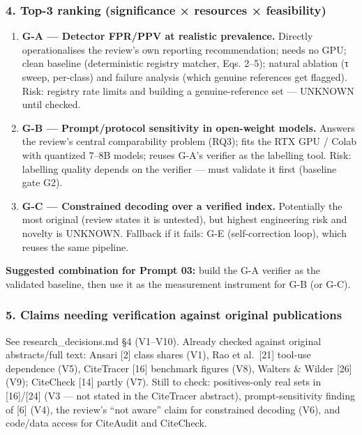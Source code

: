 \documentclass[
  10pt,
]{article}
\providecommand{\tightlist}{%
  \setlength{\itemsep}{0pt}\setlength{\parskip}{0pt}}
\begin{document}
\hypertarget{top-3-ranking-significance-resources-feasibility}{%
\subsubsection{4. Top-3 ranking (significance × resources ×
feasibility)}\label{top-3-ranking-significance-resources-feasibility}}

\begin{enumerate}
\def\labelenumi{\arabic{enumi}.}
\tightlist
\item
  \textbf{G-A --- Detector FPR/PPV at realistic prevalence.} Directly
  operationalises the review's own reporting recommendation; needs no
  GPU; clean baseline (deterministic registry matcher, Eqs. 2--5);
  natural ablation (τ sweep, per-class) and failure analysis (which
  genuine references get flagged). Risk: registry rate limits and
  building a genuine-reference set --- UNKNOWN until checked.
\item
  \textbf{G-B --- Prompt/protocol sensitivity in open-weight models.}
  Answers the review's central comparability problem (RQ3); fits the RTX
  GPU / Colab with quantized 7--8B models; reuses G-A's verifier as the
  labelling tool. Risk: labelling quality depends on the verifier ---
  must validate it first (baseline gate G2).
\item
  \textbf{G-C --- Constrained decoding over a verified index.}
  Potentially the most original (review states it is untested), but
  highest engineering risk and novelty is UNKNOWN. Fallback if it fails:
  G-E (self-correction loop), which reuses the same pipeline.
\end{enumerate}

\textbf{Suggested combination for Prompt 03:} build the G-A verifier as
the validated baseline, then use it as the measurement instrument for
G-B (or G-C).

\hypertarget{claims-needing-verification-against-original-publications}{%
\subsubsection{5. Claims needing verification against original
publications}\label{claims-needing-verification-against-original-publications}}

See research\_decisions.md §4 (V1--V10). Already checked against
original abstracts/full text: Ansari {[}2{]} class shares (V1), Rao et
al.~{[}21{]} tool-use dependence (V5), CiteTracer {[}16{]} benchmark
figures (V8), Walters \& Wilder {[}26{]} (V9); CiteCheck {[}14{]} partly
(V7). Still to check: positives-only real sets in {[}16{]}/{[}24{]} (V3
--- not stated in the CiteTracer abstract), prompt-sensitivity finding
of {[}6{]} (V4), the review's ``not aware'' claim for constrained
decoding (V6), and code/data access for CiteAudit and CiteCheck.
\end{document}
